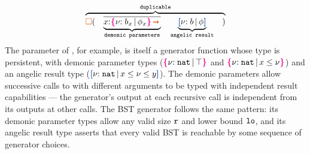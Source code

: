 \begin{align*}
    \overbrace{\ctpers (\quad \underbrace{\overline{x{:}\ort{b_x}{\phi_x}\ctsarr}}_{\texttt{demonic parameters}} \quad \underbrace{\urt{b}{\phi}}_{\texttt{angelic result}} \quad )}^{\texttt{duplicable}}
\end{align*}\noindent
The  parameter of , for example, is itself
a generator function whose type is persistent, with demonic parameter
types ($\textcolor{magenta}{\mbox{\rm\textbf{\{}}} { {\nu}{:}\;{{\tt nat}}\, |\, {\top} } \textcolor{magenta}{\mbox{\rm\textbf{\}}}}$ and $\textcolor{magenta}{\mbox{\rm\textbf{\{}}} { {\nu}{:}\;{{\tt nat}}\, |\, {x \leq \nu} } \textcolor{magenta}{\mbox{\rm\textbf{\}}}}$) and an angelic
result type ($\urt{\Nat}{x \leq \vnu \leq y}$).  The demonic parameters
allow successive calls to  with different arguments to be
typed with independent result capabilities --- the generator's output
at each recursive call is independent from its outputs at other calls.
The BST generator follows the same pattern: its demonic parameter
types allow any valid size ${\tt r}$ and lower bound ${\tt lo}$, and
its angelic result type asserts that every valid BST is reachable by
some sequence of generator choices.

